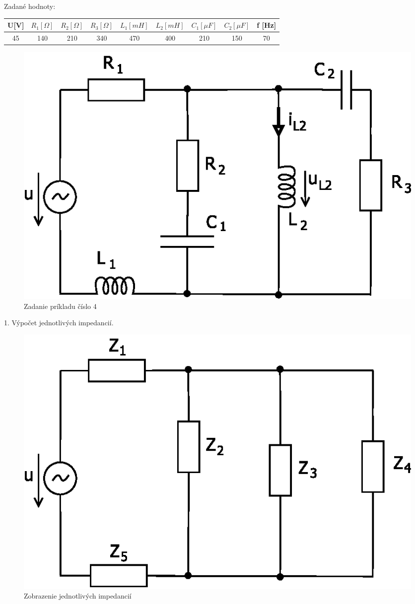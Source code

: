 \documentclass[a4paper,12pt]{article}
\begin{document}
Zadané hodnoty:
\begin{center}
\begin{tabular} {|  c | c |  c | c | c | c | c | c | c | }
\hline
U[V] &  $R_1 [\Omega]$  & $R_2 [\Omega]$  &$R_3 [\Omega]$  & $L_1 [mH]$ & $L_2 [mH]$ & $C_1[\mu F]$ & $C_2[\mu F]$  & f [Hz] \\ \hline
45 & 140 & 210 & 340 & 470 & 400 & 210 & 150 & 70\\ \hline
\end{tabular}
\end{center}

\begin{figure}[!htb]
\centering
\includegraphics[scale=1.2]{p4/p0.eps}
\caption{Zadanie príkladu číslo 4}
\end{figure}


1. Výpočet jednotlivých impedancií.
\begin{figure}[!htb]
\centering
\includegraphics[scale=1.0]{p4/p1.eps}
\caption{Zobrazenie jednotlivých impedancií}
\end{figure}
\end{document}
